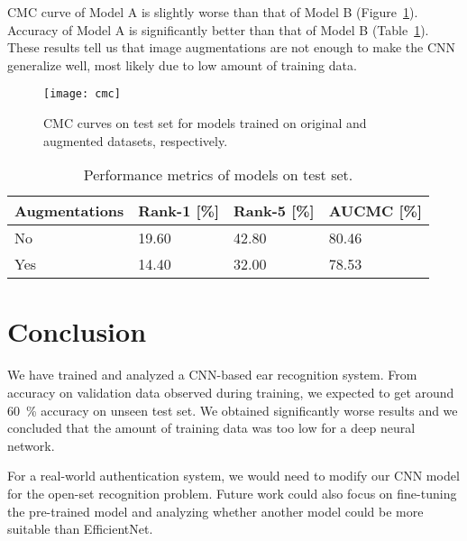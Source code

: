 \documentclass[9pt]{IEEEtran}
\begin{document}
CMC curve of Model A is slightly worse than that of Model B (Figure~\ref{fig:cmc}).
Accuracy of Model A is significantly better than that of Model B (Table~\ref{tab:metrics}).
These results tell us that image augmentations are not enough to make the CNN generalize well, most likely due to low amount of training data.

\begin{figure}[ht]
    \centering
    \texttt{[image: cmc]}
    \caption{CMC curves on test set for models trained on original and augmented datasets, respectively.}
    \label{fig:cmc}
\end{figure}

\begin{table}[ht]
    \caption{Performance metrics of models on test set.}
    \label{tab:metrics}
    \centering
    \begin{tabular}{llll}
        Augmentations & Rank-1 [\%] & Rank-5 [\%] & AUCMC [\%] \\
        \hline
        No & 19.60 & 42.80 & 80.46 \\
        Yes & 14.40 & 32.00 & 78.53
    \end{tabular}
\end{table}

\section{Conclusion}

We have trained and analyzed a CNN-based ear recognition system.
From accuracy on validation data observed during training, we expected to get around 60~\% accuracy on unseen test set.
We obtained significantly worse results and we concluded that the amount of training data was too low for a deep neural network.

For a real-world authentication system, we would need to modify our CNN model for the open-set recognition problem.
Future work could also focus on fine-tuning the pre-trained model and analyzing whether another model could be more suitable than EfficientNet.



\end{document}
